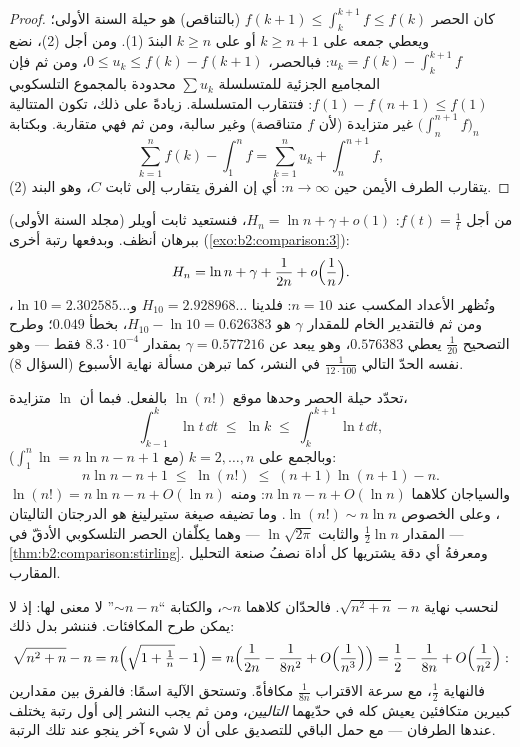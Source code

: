 \begin{proof}
كان الحصر $f(k+1) \leq \int_k^{k+1} f \leq f(k)$ (بالتناقص) هو
حيلة السنة الأولى؛ ويعطي جمعه على $k \geq n+1$ أو على $k \geq n$
البندَ (1). ومن أجل (2)، نضع $u_k = f(k) - \int_k^{k+1} f$: فبالحصر،
$0 \leq u_k \leq f(k) - f(k+1)$، ومن ثم فإن المجاميع الجزئية
للمتسلسلة $\sum u_k$ محدودة بالمجموع التلسكوبي $f(1) - f(n+1) \leq
f(1)$: فتتقارب المتسلسلة. زيادةً على ذلك، تكون المتتالية $\bigl(\int_n^{n+1}
f\bigr)_n$ غير متزايدة (لأن $f$ متناقصة) وغير سالبة، ومن ثم فهي
متقاربة. وبكتابة
\[
\sum_{k=1}^{n} f(k) - \int_1^n f
= \sum_{k=1}^{n} u_k + \int_n^{n+1} f ,
\]
يتقارب الطرف الأيمن حين $n \to \infty$: أي إن الفرق يتقارب
إلى ثابت $C$، وهو البند (2).
\end{proof}

\begin{example}\label{ex:b2:comparison:harmonic}
من أجل $f(t) = \frac1t$: $H_n = \ln n + \gamma + o(1)$، فنستعيد
ثابت أويلر (مجلد السنة الأولى) ببرهان أنظف. وبدفعها رتبة
أخرى (\cref{exo:b2:comparison:3}):
\[
H_n = \ln n + \gamma + \frac{1}{2n} + o\Bigl(\frac1n\Bigr).
\]
وتُظهر الأعداد المكسب عند $n = 10$: فلدينا $H_{10} =
2.928968\dots$ و$\ln 10 = 2.302585\dots$، ومن ثم فالتقدير الخام
للمقدار $\gamma$ هو $H_{10} - \ln 10 = 0.626383$، بخطأ $0.049$؛
وطرح التصحيح $\frac1{20}$ يعطي $0.576383$،
وهو يبعد عن $\gamma = 0.577216$ بمقدار $8.3\cdot10^{-4}$ فقط ---
وهو نفسه الحدّ التالي $\frac{1}{12\cdot100}$ في
النشر، كما تبرهن مسألة نهاية الأسبوع (السؤال 8).
\end{example}

\begin{example}\label{ex:b2:comparison:lnfactorial}
تحدّد حيلة الحصر وحدها موقع $\ln(n!)$ بالفعل. فبما أن
$\ln$ متزايدة،
\[
\int_{k-1}^{k}\ln t\,\dd t \;\leq\; \ln k \;\leq\;
\int_{k}^{k+1}\ln t\,\dd t ,
\]
وبالجمع على $k = 2, \dots, n$ (مع $\int_1^n\ln = n\ln n
- n + 1$):
\[
n\ln n - n + 1 \;\leq\; \ln(n!) \;\leq\; (n+1)\ln(n+1) - n .
\]
والسياجان كلاهما $n\ln n - n + O(\ln n)$: ومنه $\ln(n!) = n\ln
n - n + O(\ln n)$، وعلى الخصوص $\ln(n!) \sim n\ln n$.
وما تضيفه صيغة ستيرلينغ هو الدرجتان التاليتان --- المقدار $\frac12\ln n$
والثابت $\ln\sqrt{2\pi}$ --- وهما يكلّفان الحصر التلسكوبي الأدقّ
في \cref{thm:b2:comparison:stirling}. ومعرفةُ
أي دقة يشتريها كل أداة نصفُ صنعة التحليل المقارب.
\end{example}

\begin{example}\label{ex:b2:comparison:cancellation}
لنحسب نهاية $\sqrt{n^2 + n} - n$. فالحدّان كلاهما
$\sim n$، والكتابة ``$\sim n - n$'' لا معنى لها: إذ لا يمكن
طرح المكافئات. فننشر بدل ذلك:
\[
\sqrt{n^2 + n} - n
= n\Bigl(\sqrt{1 + \tfrac1n} - 1\Bigr)
= n\Bigl(\frac{1}{2n} - \frac{1}{8n^2} +
O\Bigl(\frac1{n^3}\Bigr)\Bigr)
= \frac12 - \frac{1}{8n} + O\Bigl(\frac1{n^2}\Bigr) :
\]
فالنهاية $\frac12$، مع سرعة الاقتراب $\frac1{8n}$
مكافأةً. وتستحق الآلية اسمًا: فالفرق بين مقدارين كبيرين
متكافئين يعيش كله في حدّيهما \emph{التاليين}،
ومن ثم يجب النشر إلى أول رتبة يختلف عندها الطرفان --- مع
حمل الباقي للتصديق على أن لا شيء آخر ينجو عند تلك
الرتبة.
\end{example}

